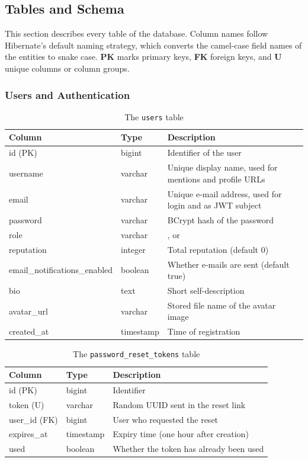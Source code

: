 \subsection{Tables and Schema}
\label{sec:tables}

This section describes every table of the database. Column names follow Hibernate's
default naming strategy, which converts the camel-case field names of the entities to
snake case. \textbf{PK} marks primary keys, \textbf{FK} foreign keys, and \textbf{U}
unique columns or column groups.

\newcommand{\dbtable}[3]{%
  \begin{table}[H]
    \centering\small
    \begin{tabularx}{\textwidth}{@{}p{0.29\textwidth} p{0.17\textwidth} X@{}}
      \toprule
      \textbf{Column} & \textbf{Type} & \textbf{Description} \\
      \midrule
      #3
      \bottomrule
    \end{tabularx}
    \caption{The \texttt{#2} table}
    \label{tab:db-#1}
  \end{table}}

\subsubsection*{Users and Authentication}

\dbtable{users}{users}{
  id (PK) & bigint & Identifier of the user \\
  username & varchar & Unique display name, used for mentions and profile URLs \\
  email & varchar & Unique e-mail address, used for login and as JWT subject \\
  password & varchar & BCrypt hash of the password \\
  role & varchar & \code{STUDENT}, \code{PROFESSOR} or \code{ADMIN} \\
  reputation & integer & Total reputation (default 0) \\
  email\_notifications\_enabled & boolean & Whether e-mails are sent (default true) \\
  bio & text & Short self-description \\
  avatar\_url & varchar & Stored file name of the avatar image \\
  created\_at & timestamp & Time of registration \\
}

\dbtable{password_reset_tokens}{password\_reset\_tokens}{
  id (PK) & bigint & Identifier \\
  token (U) & varchar & Random UUID sent in the reset link \\
  user\_id (FK) & bigint & User who requested the reset \\
  expires\_at & timestamp & Expiry time (one hour after creation) \\
  used & boolean & Whether the token has already been used \\
}

